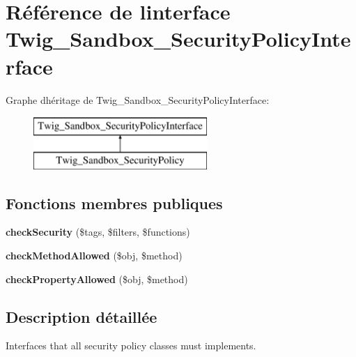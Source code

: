 \hypertarget{interface_twig___sandbox___security_policy_interface}{}\section{Référence de l\textquotesingle{}interface Twig\+\_\+\+Sandbox\+\_\+\+Security\+Policy\+Interface}
\label{interface_twig___sandbox___security_policy_interface}
Graphe d\textquotesingle{}héritage de Twig\+\_\+\+Sandbox\+\_\+\+Security\+Policy\+Interface\+:\begin{figure}[H]
\begin{center}
\leavevmode
\includegraphics[height=2.000000cm]{interface_twig___sandbox___security_policy_interface}
\end{center}
\end{figure}
\subsection*{Fonctions membres publiques}
\begin{DoxyCompactItemize}
\item 
{\bfseries check\+Security} (\$tags, \$filters, \$functions)\hypertarget{interface_twig___sandbox___security_policy_interface_a0cc084f6abef1e1ba223ddd057ddcd2b}{}\label{interface_twig___sandbox___security_policy_interface_a0cc084f6abef1e1ba223ddd057ddcd2b}

\item 
{\bfseries check\+Method\+Allowed} (\$obj, \$method)\hypertarget{interface_twig___sandbox___security_policy_interface_a90633d7d23e0b157387b886a8ef87a36}{}\label{interface_twig___sandbox___security_policy_interface_a90633d7d23e0b157387b886a8ef87a36}

\item 
{\bfseries check\+Property\+Allowed} (\$obj, \$method)\hypertarget{interface_twig___sandbox___security_policy_interface_a7dda78b41e8686064b990bb425d24700}{}\label{interface_twig___sandbox___security_policy_interface_a7dda78b41e8686064b990bb425d24700}

\end{DoxyCompactItemize}


\subsection{Description détaillée}
Interfaces that all security policy classes must implements.

